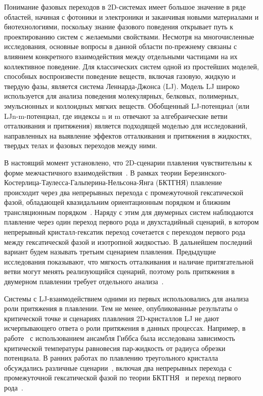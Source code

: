 Понимание фазовых переходов в 2D-системах имеет большое значение в ряде областей, начиная с фотоники и электроники  и заканчивая новыми материалами и биотехнологиями, поскольку знание фазового поведения открывает путь к проектированию систем с желаемыми свойствами.
Несмотря на многочисленные исследования, основные вопросы в данной области по-прежнему связаны с влиянием конкретного взаимодействия между отдельными частицами на их коллективное поведение.
Для классических систем одной из простейших моделей, способных воспроизвести поведение веществ, включая газовую, жидкую и твердую фазы, является система Леннарда-Джонса (LJ).
Модель LJ широко используется для анализа поведения молекулярных, белковых, полимерных, эмульсионных и коллоидных мягких веществ.
Обобщенный LJ-потенциал (или LJn-m-потенциал, где индексы n и m отвечают за алгебраические ветви отталкивания и притяжения) является подходящей моделью для исследований, направленных на выявление эффектов отталкивания и притяжения в жидкостях, твердых телах и фазовых переходов между ними.

В настоящий момент установлено, что 2D-сценарии плавления чувствительны к форме межчастичного взаимодействия~\cite{10.3367/ufne.2017.06.038161, 10.3367/ufne.2018.04.038417}.
В рамках теории Березинского-Костерлица-Таулесса-Гальперина-Нельсона-Янга (БКТГНЯ) плавление происходит через два непрерывных перехода с промежуточной гексатической фазой, обладающей квазидальним ориентационным порядком и ближним трансляционным порядком~\cite{10.1088/0022-3719/6/7/010, 10.1103/physrevlett.41.121, 10.1103/physrevb.19.2457, 10.1103/physrevb.19.1855}.
Наряду с этим для двумерных систем наблюдаются плавление через один переход первого рода и двухстадийный сценарий, в котором непрерывный кристалл-гексатик переход сочетается с переходом первого рода между гексатической фазой и изотропной жидкостью.
В дальнейшем последний вариант будем называть третьим сценарием плавления.
Предыдущие исследования показывают, что мягкость отталкивания и наличие притягательной ветви могут менять реализующийся сценарий, поэтому роль притяжения в двумерном плавлении требует отдельного анализа~\cite{10.1103/physrevlett.114.035702, 10.1103/physrevlett.124.218002}.

Системы с LJ-взаимодействием одними из первых использовались для анализа роли притяжения в плавлении.
Тем не менее, опубликованные результаты о критической точке и сценариях плавления 2D-кристаллов LJ не дают исчерпывающего ответа о роли притяжения в данных процессах.
Например, в работе~\cite{10.1063/1.460477} с использованием ансамбля Гиббса была исследована зависимость критической температуры равновесия пар-жидкость от радиуса обрезки потенциала.
В ранних работах по плавлению треугольного кристалла обсуждались различные сценарии~\cite{10.1103/physrevlett.42.1632, 10.1063/1.436526, 10.1103/physrevlett.44.463, 10.1063/1.441901, 10.1103/physrevlett.52.449, 10.1103/physrevb.30.2755}, включая два непрерывных перехода с промежуточной гексатической фазой по теории БКТГНЯ~\cite{10.1103/physrevlett.42.1632} и переход первого рода~\cite{10.1063/1.436526, 10.1103/physrevlett.44.463, 10.1063/1.441901, 10.1103/physrevlett.52.449}.

